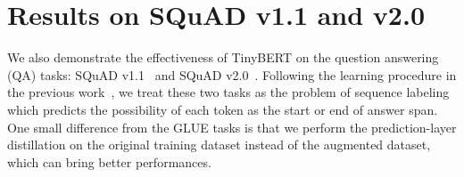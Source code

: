 \documentclass[11pt,a4paper]{article}
\begin{document}
\section{Results on SQuAD v1.1 and v2.0}
\label{apx:qa_tasks}
We also demonstrate the effectiveness of TinyBERT on the question answering (QA) tasks: SQuAD v1.1~\citep{rajpurkar2016squad} and SQuAD v2.0~\citep{rajpurkar2018know}. Following the learning procedure in the previous work~\citep{devlin2019bert}, we treat these two tasks as the problem of sequence labeling which predicts the possibility of each token as the start or end of answer span. 
One small difference from the GLUE tasks is that we perform the prediction-layer distillation on the original training dataset instead of the augmented dataset, which can bring better performances. 
\end{document}
